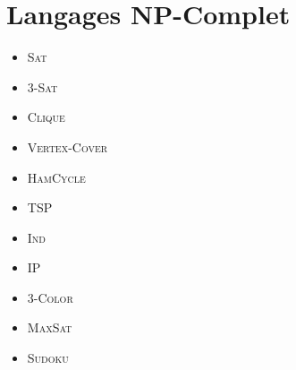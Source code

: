\documentclass[a4paper,11pt]{report}
\begin{document}
\section{Langages NP-Complet}
\begin{itemize}
\item \textsc{Sat}
\item \textsc{3-Sat}
\item \textsc{Clique}
\item \textsc{Vertex-Cover}
\item \textsc{HamCycle}
\item \textsc{TSP}
\item \textsc{Ind}
\item \textsc{IP}
\item \textsc{3-Color}
\item \textsc{MaxSat}
\item \textsc{Sudoku}
\end{itemize}
\end{document}
